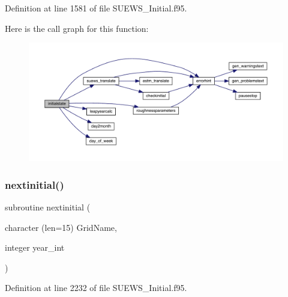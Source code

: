 Definition at line 1581 of file S\+U\+E\+W\+S\+\_\+\+Initial.\+f95.

Here is the call graph for this function\+:\nopagebreak
\begin{figure}[H]
\begin{center}
\leavevmode
\includegraphics[width=350pt]{_s_u_e_w_s___initial_8f95_a9e4519818c5c3fcbefcdd1e02030275b_cgraph}
\end{center}
\end{figure}
\mbox{\label{_s_u_e_w_s___initial_8f95_acde97a1be2a58d77e93b4348c1595689}} 
\subsubsection{\texorpdfstring{nextinitial()}{nextinitial()}}
{\footnotesize\ttfamily subroutine nextinitial (\begin{DoxyParamCaption}\item[{character (len=15)}]{Grid\+Name,  }\item[{integer}]{year\+\_\+int }\end{DoxyParamCaption})}



Definition at line 2232 of file S\+U\+E\+W\+S\+\_\+\+Initial.\+f95.

